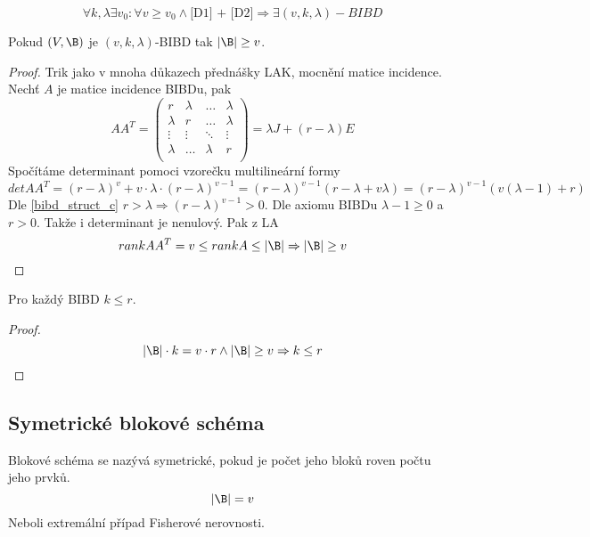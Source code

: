\begin{theorem}[Wilson (1975) BD]
	\[ \forall k, \lambda \exists v_0: \forall v \geq v_0 \land \text{[D1] + [D2]} \Rightarrow \exists (v, k, \lambda)-BIBD \]
\end{theorem}

\begin{theorem}\label{fisher}
	Pokud $(V, \B)$ je $(v, k, \lambda)$-BIBD tak $|\B| \geq v$.
\end{theorem}
\begin{proof}
	Trik jako v mnoha důkazech přednášky LAK, mocnění matice incidence.
	Nechť $A$ je matice incidence BIBDu, pak
	\[ AA^T =
	\begin{pmatrix}
	r & \lambda & \ldots & \lambda \\
	\lambda & r & \ldots & \lambda \\
	\vdots & \vdots & \ddots & \vdots \\
	\lambda & \ldots & \lambda & r \\
	\end{pmatrix}
	= \lambda J + (r - \lambda)E
\]
	Spočítáme determinant pomoci vzorečku multilineární formy
	\[ det AA^{T} = (r - \lambda)^v + v \cdot \lambda \cdot (r - \lambda)^{v - 1} = (r - \lambda)^{v - 1}(r - \lambda + v \lambda) = (r - \lambda)^{v - 1}(v(\lambda - 1) + r) \]
	Dle \cref{bibd_struct_c} $r > \lambda \Rightarrow (r - \lambda)^{v - 1} > 0$.
	Dle axiomu BIBDu $\lambda - 1 \geq 0$ a $r > 0$.
	Takže i determinant je nenulový.
	Pak z LA
	\[ rank AA^{T} = v \leq rank A \leq |\B| \Rightarrow |\B| \geq v \]
\end{proof}

\begin{consequence}
	Pro každý BIBD $k \leq r$.
\end{consequence}
\begin{proof}
	\[ |\B| \cdot k = v \cdot r \land |\B| \geq v \Rightarrow k \leq r \]
\end{proof}

\subsection{Symetrické blokové schéma}

\begin{definition}
	Blokové schéma se nazývá symetrické, pokud je počet jeho bloků roven počtu jeho prvků.
	\[ |\B| = v \]
	Neboli extremální případ Fisherové nerovnosti.
\end{definition}

